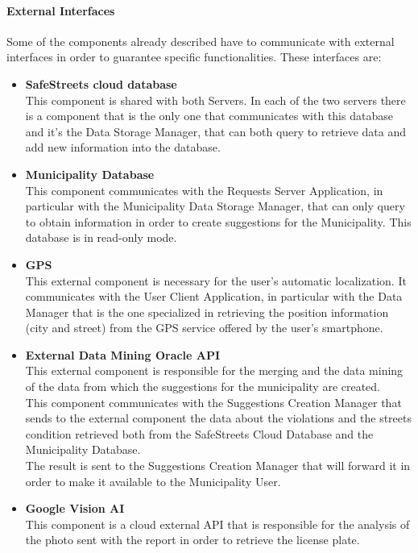 \documentclass[titlepage]{article}
\begin{document}
\paragraph{\textbf{External Interfaces}}
Some of the components already described have to communicate with external interfaces in order to guarantee specific functionalities. These interfaces are:
\begin{itemize}
\item \textbf{SafeStreets cloud database}\\
This component is shared with both Servers. In each of the two servers there is a component that is the only one that communicates with this database and it's the Data Storage Manager, that can both query to retrieve data and add new information into the database.
\item \textbf{Municipality Database}\\
This component communicates with the Requests Server Application, in particular with the Municipality Data Storage Manager, that can only query to obtain information in order to create suggestions for the Municipality. This database is in read-only mode.
\item \textbf{GPS}\\
This external component is necessary for the user's automatic localization. It communicates with the User Client Application, in particular with the Data Manager that is the one specialized in retrieving the position information (city and street) from the GPS service offered by the user's smartphone.
\item \textbf{External Data Mining Oracle API}\\
This external component is responsible for the merging and the data mining of the data from which the suggestions for the municipality are created. \\
This component communicates with the Suggestions Creation Manager that sends to the external component the data about the violations and the streets condition retrieved both from the SafeStreets Cloud Database and the Municipality Database. \\
The result is sent to the Suggestions Creation Manager that will forward it in order to make it available to the Municipality User.
\item \textbf{Google Vision AI}\\
This component is a cloud external API that is responsible for the analysis of the photo sent with the report in order to retrieve the license plate. \\

\end{itemize}
\end{document}
